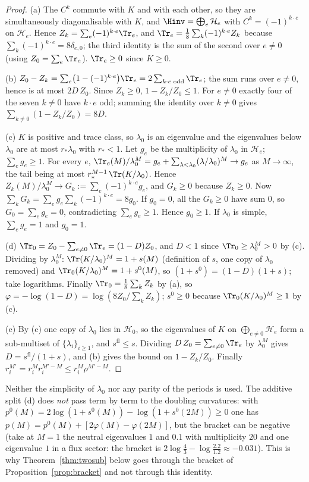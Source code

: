 \begin{proof}
(a) The $C^k$ commute with $K$ and with each other, so they are simultaneously diagonalisable with $K$, and $\Hinv=\bigoplus_e\mathcal H_e$ with $C^k=(-1)^{k\cdot e}$ on $\mathcal H_e$. Hence $Z_k=\sum_e(-1)^{k\cdot e}\Tr_e$, and $\Tr_e=\frac18\sum_k(-1)^{k\cdot e}Z_k$ because $\sum_k(-1)^{k\cdot e}=8\delta_{e,0}$; the third identity is the sum of the second over $e\ne0$ (using $Z_0=\sum_e\Tr_e$). $\Tr_e\ge0$ since $K\ge0$.

(b) $Z_0-Z_k=\sum_e\bigl(1-(-1)^{k\cdot e}\bigr)\Tr_e=2\sum_{k\cdot e\text{ odd}}\Tr_e$; the sum runs over $e\ne0$, hence is at most $2D\,Z_0$. Since $Z_k\ge0$, $1-Z_k/Z_0\le1$. For $e\ne0$ exactly four of the seven $k\ne0$ have $k\cdot e$ odd; summing the identity over $k\ne0$ gives $\sum_{k\ne0}(1-Z_k/Z_0)=8D$.

(c) $K$ is positive and trace class, so $\lambda_0$ is an eigenvalue and the eigenvalues below $\lambda_0$ are at most $r_*\lambda_0$ with $r_*<1$. Let $g_e$ be the multiplicity of $\lambda_0$ in $\mathcal H_e$; $\sum_eg_e\ge1$. For every $e$, $\Tr_e(M)/\lambda_0^M=g_e+\sum_{\lambda<\lambda_0}(\lambda/\lambda_0)^M\to g_e$ as $M\to\infty$, the tail being at most $r_*^{M-1}\,\Tr(K/\lambda_0)$. Hence $Z_k(M)/\lambda_0^M\to G_k:=\sum_e(-1)^{k\cdot e}g_e$, and $G_k\ge0$ because $Z_k\ge0$. Now $\sum_kG_k=\sum_eg_e\sum_k(-1)^{k\cdot e}=8g_0$. If $g_0=0$, all the $G_k\ge0$ have sum $0$, so $G_0=\sum_eg_e=0$, contradicting $\sum_eg_e\ge1$. Hence $g_0\ge1$. If $\lambda_0$ is simple, $\sum_eg_e=1$ and $g_0=1$.

(d) $\Tr_0=Z_0-\sum_{e\ne0}\Tr_e=(1-D)Z_0$, and $D<1$ since $\Tr_0\ge\lambda_0^M>0$ by (c). Dividing by $\lambda_0^M$: $\Tr(K/\lambda_0)^M=1+s(M)$ (definition of $s$, one copy of $\lambda_0$ removed) and $\Tr_0(K/\lambda_0)^M=1+s^0(M)$, so $(1+s^0)=(1-D)(1+s)$; take logarithms. Finally $\Tr_0=\frac18\sum_kZ_k$ by (a), so $\varphi=-\log(1-D)=\log(8Z_0/\sum_kZ_k)$; $s^0\ge0$ because $\Tr_0(K/\lambda_0)^M\ge1$ by (c).

(e) By (c) one copy of $\lambda_0$ lies in $\mathcal H_0$, so the eigenvalues of $K$ on $\bigoplus_{e\ne0}\mathcal H_e$ form a sub-multiset of $\{\lambda_i\}_{i\ge1}$, and $s^{\mathrm{fl}}\le s$. Dividing $D\,Z_0=\sum_{e\ne0}\Tr_e$ by $\lambda_0^M$ gives $D=s^{\mathrm{fl}}/(1+s)$, and (b) gives the bound on $1-Z_k/Z_0$. Finally $r_i^{M'}=r_i^Mr_i^{M'-M}\le r_i^M\rho^{M'-M}$.
\end{proof}
Neither the simplicity of $\lambda_0$ nor any parity of the periods is used. The additive split (d) does \emph{not} pass term by term to the doubling curvatures: with $p^0(M)=2\log(1+s^0(M))-\log(1+s^0(2M))\ge0$ one has $p(M)=p^0(M)+[2\varphi(M)-\varphi(2M)]$, but the bracket can be negative (take at $M=1$ the neutral eigenvalues $1$ and $0.1$ with multiplicity $20$ and one eigenvalue $1$ in a flux sector: the bracket is $2\log\frac43-\log\frac{2.2}{1.2}\approx-0.031$). This is why Theorem~\ref{thm:twosub} below goes through the bracket of Proposition~\ref{prop:bracket} and not through this identity.

